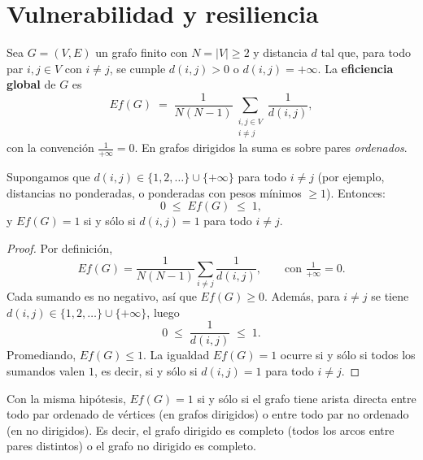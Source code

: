         \section{Vulnerabilidad y resiliencia}

            \begin{definicion}
                Sea $G=(V,E)$ un grafo finito con $N=|V|\ge 2$ y distancia $d$ tal que, para todo par $i,j\in V$ con $i\neq j$, se cumple $d(i,j)>0$ o $d(i,j)=+\infty$. La \textbf{eficiencia global} de $G$ es
                \[
                Ef(G)\;=\;\frac{1}{N(N-1)}\sum_{\substack{i,j\in V\\ i\neq j}}\frac{1}{d(i,j)},
                \]
                con la convención $\frac{1}{+\infty}=0$. En grafos dirigidos la suma es sobre pares \emph{ordenados}.
            \end{definicion}

            \begin{proposicion}
                Supongamos que $d(i,j)\in\{1,2,\dots\}\cup\{+\infty\}$ para todo $i\neq j$ (por ejemplo, distancias no ponderadas, o ponderadas con pesos mínimos $\ge 1$). Entonces:
                \[
                0 \;\le\; Ef(G) \;\le\; 1,
                \]
                y $Ef(G)=1$ si y sólo si $d(i,j)=1$ para todo $i\neq j$.
            \end{proposicion}

            \begin{proof}
                Por definición,
                \[
                Ef(G)=\frac{1}{N(N-1)}\sum_{i\neq j}\frac{1}{d(i,j)},
                \qquad \text{con } \tfrac{1}{+\infty}=0.
                \]
                Cada sumando es no negativo, así que $Ef(G)\ge 0$. Además, para $i\neq j$ se tiene $d(i,j)\in\{1,2,\dots\}\cup\{+\infty\}$, luego
                \[
                0 \;\le\; \frac{1}{d(i,j)} \;\le\; 1.
                \]
                Promediando, $Ef(G)\le 1$. La igualdad $Ef(G)=1$ ocurre si y sólo si todos los sumandos valen $1$, es decir, si y sólo si $d(i,j)=1$ para todo $i\neq j$.
            \end{proof}

            \begin{corolario}
                Con la misma hipótesis, $Ef(G)=1$ si y sólo si el grafo tiene arista directa entre todo par ordenado de vértices (en grafos dirigidos) o entre todo par no ordenado (en no dirigidos). Es decir, el grafo dirigido es completo (todos los arcos entre pares distintos) o el grafo no dirigido es completo.
            \end{corolario}

